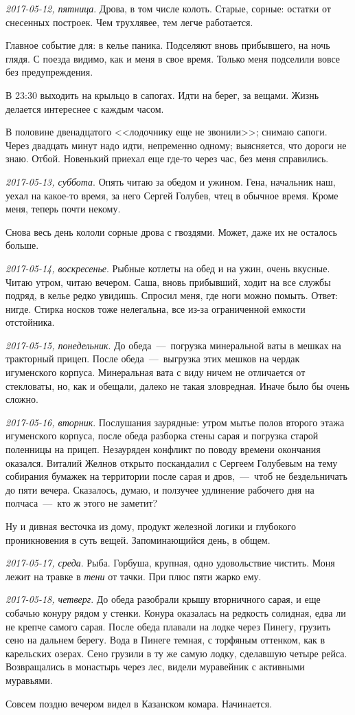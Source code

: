 \documentclass[
    12pt
    ,a4paper
    ,oneside
    ,russian
]{memoir}
\newcommand{\mydatestamp}{
    \bigskip   %
    \emph
}
\newcommand{\mds}{\mydatestamp}
\begin{document}
    \mds{2017-05-12, пятница}. Дрова, в том числе колоть. Старые, сорные: остатки от снесенных построек. Чем трухлявее, тем легче работается.

    Главное событие для: в келье паника. Подселяют вновь прибывшего, на ночь глядя. С поезда видимо, как и меня в свое время. Только меня подселили вовсе без предупреждения.

    В 23:30 выходить на крыльцо в сапогах. Идти на берег, за вещами. Жизнь делается интереснее с каждым часом.

    В половине двенадцатого <<лодочнику еще не звонили>>; снимаю сапоги. Через двадцать минут надо идти, непременно одному; выясняется, что дороги не знаю. Отбой. Новенький приехал еще где-то через час, без меня справились.

    \mds{2017-05-13, суббота}. Опять читаю за обедом и ужином. Гена, начальник наш, уехал на какое-то время, за него Сергей Голубев, чтец в обычное время. Кроме меня, теперь почти некому.

    Снова весь день кололи сорные дрова с гвоздями. Может, даже их не осталось больше.
    
    \mds{2017-05-14, воскресенье}. Рыбные котлеты на обед и на ужин, очень вкусные. Читаю утром, читаю вечером. Саша, вновь прибывший, ходит на все службы подряд, в келье редко увидишь. Спросил меня, где ноги можно помыть. Ответ: нигде. Стирка носков тоже нелегальна, все из-за ограниченной емкости отстойника.

    \mds{2017-05-15, понедельник}. До обеда~---~погрузка минеральной ваты в мешках на тракторный прицеп. После обеда~---~выгрузка этих мешков на чердак игуменского корпуса. Минеральная вата с виду ничем не отличается от стекловаты, но, как и обещали, далеко не такая зловредная. Иначе было бы очень сложно.

    \mds{2017-05-16, вторник}. Послушания заурядные: утром мытье полов второго этажа игуменского корпуса, после обеда разборка стены сарая и погрузка старой поленницы на прицеп. Незауряден конфликт по поводу времени окончания оказался. Виталий Желнов открыто поскандалил с Сергеем Голубевым на тему собирания бумажек на территории после сарая и дров,~---~чтоб не бездельничать до пяти вечера. Сказалось, думаю, и ползучее удлинение рабочего дня на полчаса~---~кто ж этого не заметит?

    Ну и дивная весточка из дому, продукт железной логики и глубокого проникновения в суть вещей. Запоминающийся день, в общем.

    \mds{2017-05-17, среда}. Рыба. Горбуша, крупная, одно удовольствие чистить. Моня лежит на травке в \emph{тени} от тачки. При плюс пяти жарко ему.

    \mds{2017-05-18, четверг}. До обеда разобрали крышу вторничного сарая, и еще собачью конуру рядом у стенки. Конура оказалась на редкость солидная, едва ли не крепче самого сарая. После обеда плавали на лодке через Пинегу, грузить сено на дальнем берегу. Вода в Пинеге темная, с торфяным оттенком, как в карельских озерах. Сено грузили в ту же самую лодку, сделавшую четыре рейса. Возвращались в монастырь через лес, видели муравейник с активными муравьями.

    Совсем поздно вечером видел в Казанском комара. Начинается.
\end{document}
